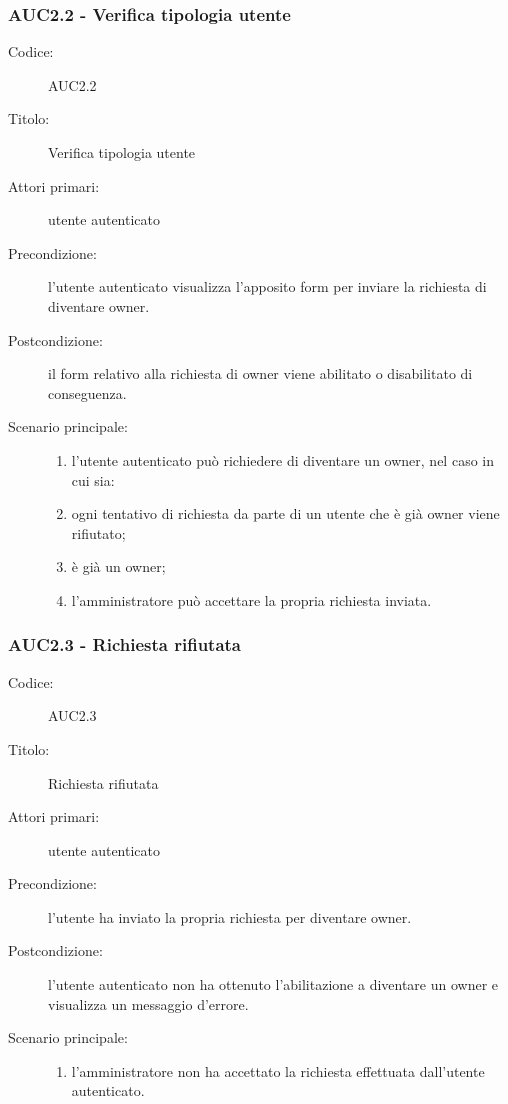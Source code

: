 \documentclass[../analisi-dei-requisiti.tex]{subfiles}
\begin{document}
\subsubsection{AUC2.2 - Verifica tipologia utente}%
\label{subsub:AUC2.2}
\begin{description}
  \item[Codice:] AUC2.2
  \item[Titolo:] Verifica tipologia utente
  \item[Attori primari:] utente autenticato
  \item[Precondizione:] l'utente autenticato visualizza l'apposito form per inviare la richiesta di diventare owner.
  \item[Postcondizione:] il form relativo alla richiesta di owner viene abilitato o disabilitato di conseguenza.
  \item[Scenario principale:]
  \begin{enumerate}
    \item l'utente autenticato può richiedere di diventare un owner, nel caso in cui sia:
    \item ogni tentativo di richiesta da parte di un utente che è già owner viene rifiutato;
    \item {} è già un owner;
    \item l'amministratore può accettare la propria richiesta inviata.
  \end{enumerate}
\end{description}

\subsubsection{AUC2.3 - Richiesta rifiutata}%
\label{subsub:AUC2.3}
\begin{description}
  \item[Codice:] AUC2.3
  \item[Titolo:] Richiesta rifiutata
  \item[Attori primari:] utente autenticato
  \item[Precondizione:] l'utente ha inviato la propria richiesta per diventare owner.
  \item[Postcondizione:] l'utente autenticato non ha ottenuto l'abilitazione a diventare un owner e visualizza un messaggio d'errore.
  \item[Scenario principale:]
  \begin{enumerate}
    \item l'amministratore non ha accettato la richiesta effettuata dall'utente autenticato.
  \end{enumerate}
\end{description}
\end{document}

